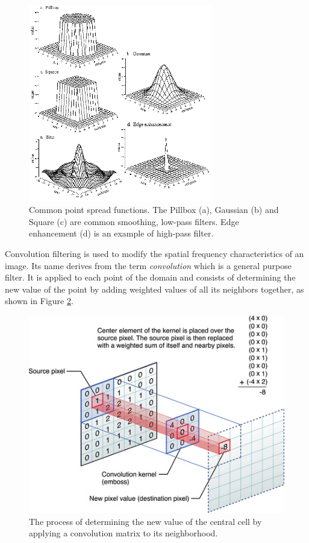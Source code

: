  \begin{figure}
    \begin{center}
        \includegraphics[width=0.72\textwidth]{./images/opencal/kernel_functions}
        \caption[Common point spread functions.]{Common point spread functions. The Pillbox (a), Gaussian (b) and Square (c) are common smoothing, low-pass filters. Edge enhancement (d) is an example of high-pass filter. }
        \label{fig:kernel_functions}
    \end{center}
\end{figure}
Convolution filtering is used to modify the spatial frequency
characteristics of an image. Its name derives from the term \textit{convolution} which is a general purpose filter. It is applied to each  point of the domain and consists of determining the new value of the point by adding weighted values of all its neighbors together, as shown in Figure \ref{fig:convolution}.
 \begin{figure}
    \begin{center}
        \includegraphics[width=1.0\textwidth]{./images/opencal/kernel_convolution}
        \caption{The process of determining the new value of the central cell by applying a convolution matrix to its neighborhood.}
        \label{fig:convolution}
    \end{center}
\end{figure}
